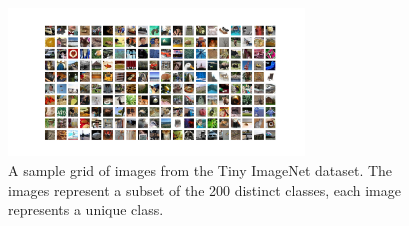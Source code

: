 \begin{figure}[ht!]
  \centering
  \includegraphics[width=0.7\textwidth]{chapter_dlo/assets/tinyimagenet_example.png}
  \caption{A sample grid of images from the Tiny ImageNet dataset. The images
    represent a subset of the 200 distinct classes, each image represents a
    unique class.}
  \label{fig:intro:tinyimagenet_examples}
\end{figure}




